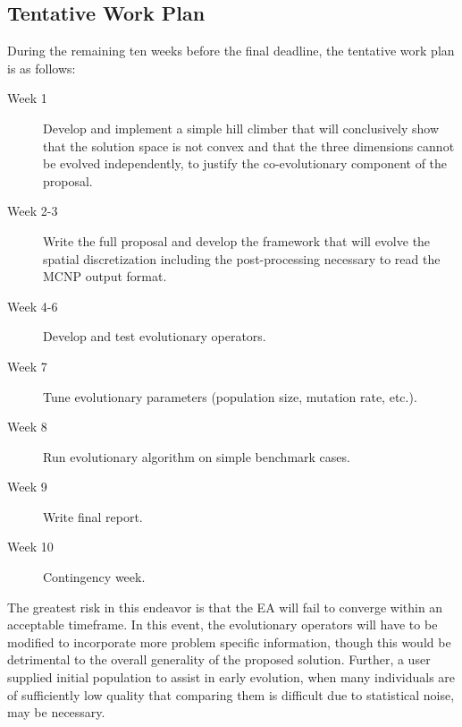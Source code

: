 \documentclass{article}
\begin{document}
\subsection{Tentative Work Plan}\label{sec:b5}
During the remaining ten weeks before the final deadline, the tentative work plan is as follows:

\begin{description}
\item[Week 1] Develop and implement a simple hill climber that will conclusively show that the solution space is not convex and that the three dimensions cannot be evolved independently, to justify the co-evolutionary component of the proposal.

\item[Week 2-3] Write the full proposal and develop the framework that will evolve the spatial discretization including the post-processing necessary to read the MCNP output format.

\item [Week 4-6] Develop and test evolutionary operators.

\item [Week 7] Tune evolutionary parameters (population size, mutation rate, etc.).

\item [Week 8] Run evolutionary algorithm on simple benchmark cases.

\item [Week 9] Write final report.

\item [Week 10] Contingency week.
\end{description}

The greatest risk in this endeavor is that the EA will fail to converge within an acceptable timeframe. In this event, the evolutionary operators will have to be modified to incorporate more problem specific information, though this would be detrimental to the overall generality of the proposed solution. Further, a user supplied initial population to assist in early evolution, when many individuals are of sufficiently low quality that comparing them is difficult due to statistical noise, may be necessary.
\end{document}
